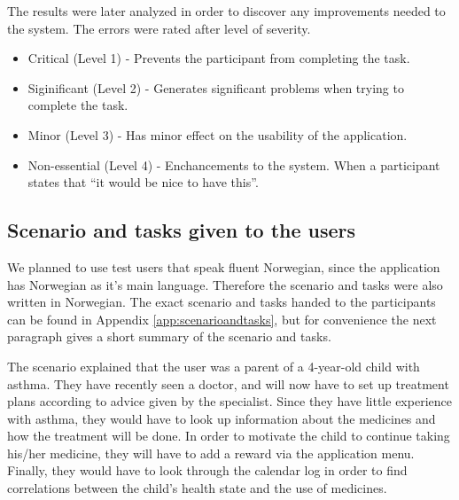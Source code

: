 The results were later analyzed in order to discover any improvements needed to the system. The errors were rated after level of severity\cite{dumas1995practical}. 

\begin{itemize}
\item{Critical (Level 1) - Prevents the participant from completing the task.}
\item{Siginificant (Level 2) - Generates significant problems when trying to complete the task.}
\item{Minor (Level 3) - Has minor effect on the usability of the application.}
\item{Non-essential (Level 4) - Enchancements to the system. When a participant states that ``it would be nice to have this''.}
\end{itemize}



\subsection{Scenario and tasks given to the users}
We planned to use test users that speak fluent Norwegian, since the application has Norwegian as it's main language. Therefore the scenario and tasks were also written in Norwegian. The exact scenario and tasks handed to the participants can be found in Appendix \ref{app:scenarioandtasks}, but for convenience the next paragraph gives a short summary of the scenario and tasks.

The scenario explained that the user was a parent of a 4-year-old child with asthma. They have recently seen a doctor, and will now have to set up treatment plans according to advice given by the specialist. Since they have little experience with asthma, they would have to look up information about the medicines and how the treatment will be done. In order to motivate the child to continue taking his/her medicine, they will have to add a reward via the application menu. Finally, they would have to look through the calendar log in order to find correlations between the child's health state and the use of medicines. 